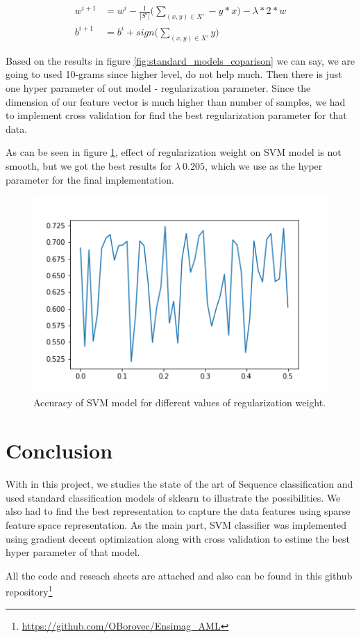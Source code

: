 \documentclass{article}
\begin{document}
\begin{equation}\label{eq:svm_update}
\begin{split}
w^{i+1} & = w^i -  \frac{1}{|S'|} \Big(\sum_{(x, y) \in X'} -y * x\Big) - \lambda * 2 * w\\
b^{i+1} & = b^i + sign\Big(\sum_{(x, y) \in X'} y\Big)
\end{split}
\end{equation}

Based on the results in figure \ref{fig:standard_models_coparison} we can say, we are going to used 10-grams since higher level, do not help much. Then there is just one hyper parameter of out model - regularization parameter. Since the dimension of our feature vector is much higher than number of samples, we had to implement cross validation for find the best regularization parameter for that data.

As can be seen in figure \ref{fig:reg_param_coparison}, effect of regularization weight on SVM model is not smooth, but we got the best results for $\lambda ~ 0.205$, which we use as the hyper parameter for the final implementation.

\begin{figure}[h]
    \centering
    \includegraphics[width=1\textwidth]{imgs/reg_weight_accuracy.png}
    \caption{Accuracy of SVM model for different values of regularization weight.}
    \label{fig:reg_param_coparison}
\end{figure}

\section{Conclusion}

With in this project, we studies the state of the art of Sequence classification and used standard classification models of sklearn to illustrate the possibilities. We also had to find the best representation to capture the data features using sparse feature space representation. As the main part, SVM classifier was implemented using gradient decent optimization along with cross validation to estime the best hyper parameter of that model.

All the code and reseach sheets are attached and also can be found in this github repository\footnote{\url{https://github.com/OBorovec/Ensimag_AML}}

\printbibliography
\end{document}
